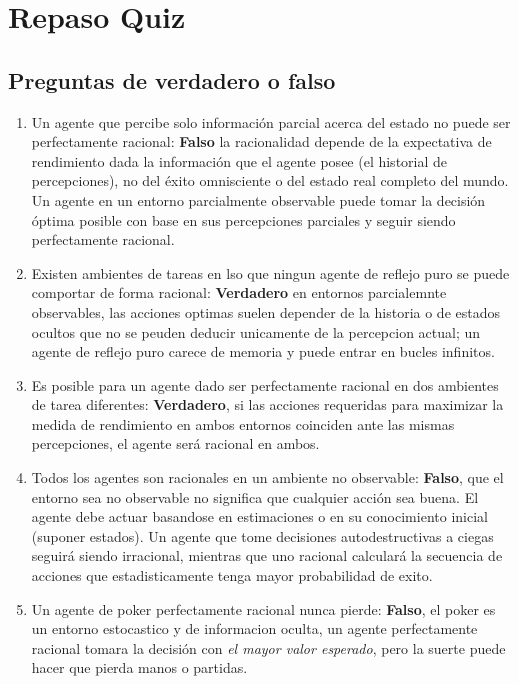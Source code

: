 \section{Repaso Quiz}

\subsection{Preguntas de verdadero o falso}

\begin{enumerate}
	\item Un agente que percibe solo información parcial acerca del estado no puede ser perfectamente racional: \textbf{Falso} la racionalidad depende de la expectativa de rendimiento dada la información que el agente posee (el historial de percepciones), no del éxito omnisciente o del estado real completo del mundo. Un agente en un entorno parcialmente observable puede tomar la decisión óptima posible con base en sus percepciones parciales y seguir siendo perfectamente racional.
	\item Existen ambientes de tareas en lso que ningun agente de reflejo puro se puede comportar de forma racional: \textbf{Verdadero} en entornos parcialemnte observables, las acciones optimas suelen depender de la historia o de estados ocultos que no se peuden deducir unicamente de la percepcion actual; un agente de reflejo puro carece de memoria y puede entrar en bucles infinitos.
	\item Es posible para un agente dado ser perfectamente racional en dos ambientes de tarea diferentes: \textbf{Verdadero}, si las acciones requeridas para maximizar la medida de rendimiento en ambos entornos coinciden ante las mismas percepciones, el agente será racional en ambos.
	\item Todos los agentes son racionales en un ambiente no observable: \textbf{Falso}, que el entorno sea no observable no significa que cualquier acción sea buena. El agente debe actuar basandose en estimaciones o en su conocimiento inicial (suponer estados). Un agente que tome decisiones autodestructivas a ciegas seguirá siendo irracional, mientras que uno racional calculará la secuencia de acciones que estadisticamente tenga mayor probabilidad de exito.
	\item Un agente de poker perfectamente racional nunca pierde: \textbf{Falso}, el poker es un entorno estocastico y de informacion oculta, un agente perfectamente racional tomara la decisión con \textit{el mayor valor esperado}, pero la suerte puede hacer que pierda manos o partidas.
	
\end{enumerate}

